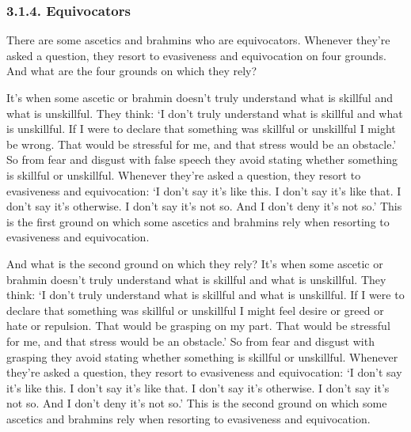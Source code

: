 \documentclass[12pt,openany]{book}%
\begin{document}
\subsubsection*{3.1.4. Equivocators }

There are some ascetics and brahmins who are equivocators. Whenever they’re asked a question, they resort to evasiveness and equivocation on four grounds. And what are the four grounds on which they rely? 

It’s when some ascetic or brahmin doesn’t truly understand what is skillful and what is unskillful. They think: ‘I don’t truly understand what is skillful and what is unskillful. If I were to declare that something was skillful or unskillful I might be wrong. That would be stressful for me, and that stress would be an obstacle.’ So from fear and disgust with false speech they avoid stating whether something is skillful or unskillful. Whenever they’re asked a question, they resort to evasiveness and equivocation: ‘I don’t say it’s like this. I don’t say it’s like that. I don’t say it’s otherwise. I don’t say it’s not so. And I don’t deny it’s not so.’ This is the first ground on which some ascetics and brahmins rely when resorting to evasiveness and equivocation. 

And what is the second ground on which they rely? It’s when some ascetic or brahmin doesn’t truly understand what is skillful and what is unskillful. They think: ‘I don’t truly understand what is skillful and what is unskillful. If I were to declare that something was skillful or unskillful I might feel desire or greed or hate or repulsion. That would be grasping on my part. That would be stressful for me, and that stress would be an obstacle.’ So from fear and disgust with grasping they avoid stating whether something is skillful or unskillful. Whenever they’re asked a question, they resort to evasiveness and equivocation: ‘I don’t say it’s like this. I don’t say it’s like that. I don’t say it’s otherwise. I don’t say it’s not so. And I don’t deny it’s not so.’ This is the second ground on which some ascetics and brahmins rely when resorting to evasiveness and equivocation. 
\end{document}
